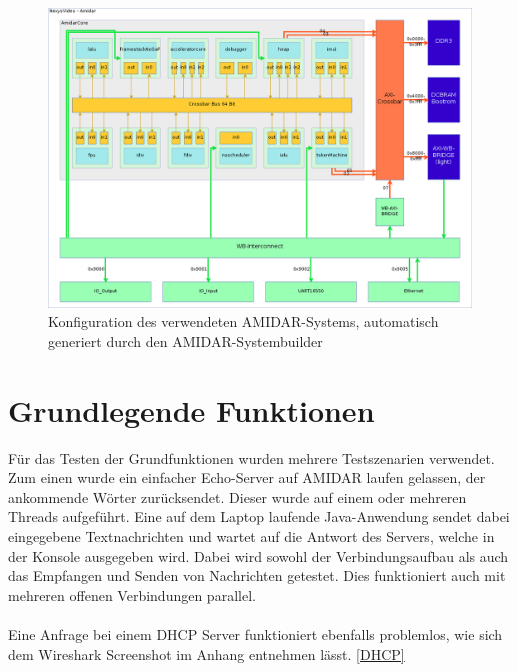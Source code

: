 \begin{figure}
	\centering
	\includegraphics[width = 1\textwidth]{Graphics/system.png}
	\caption{Konfiguration des verwendeten AMIDAR-Systems, automatisch generiert durch den AMIDAR-Systembuilder}

\end{figure}

\FloatBarrier
\section{Grundlegende Funktionen}

Für das Testen der Grundfunktionen wurden mehrere Testszenarien verwendet. Zum einen wurde ein einfacher Echo-Server auf AMIDAR laufen gelassen, der ankommende Wörter zurücksendet. Dieser wurde auf einem oder mehreren Threads aufgeführt. Eine auf dem Laptop laufende Java-Anwendung sendet dabei eingegebene Textnachrichten und wartet auf die Antwort des Servers, welche in der Konsole ausgegeben wird. Dabei wird sowohl der Verbindungsaufbau als auch das Empfangen und Senden von Nachrichten getestet. Dies funktioniert auch mit mehreren offenen Verbindungen parallel. \\\\
Eine Anfrage bei einem DHCP Server funktioniert ebenfalls problemlos, wie sich dem Wireshark Screenshot im Anhang entnehmen lässt. \autoref{DHCP}




